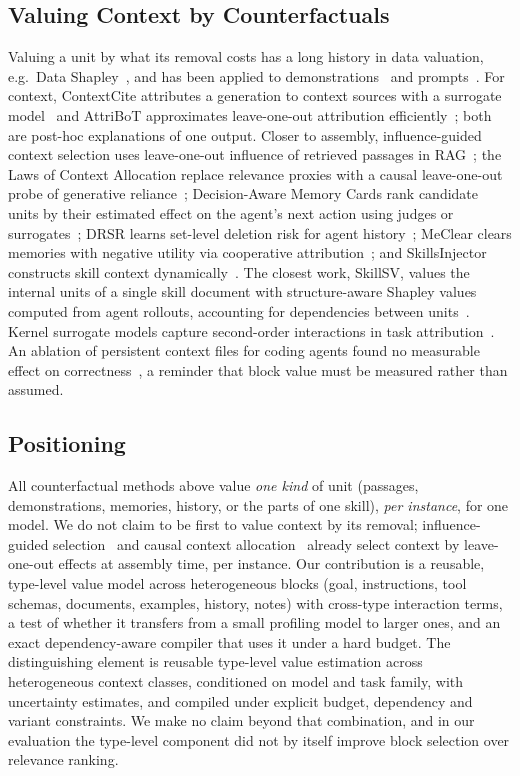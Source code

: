 \subsection{Valuing Context by Counterfactuals}
Valuing a unit by what its removal costs has a long history in data valuation, e.g.\ Data Shapley~\citep{datashapley2019},
and has been applied to demonstrations~\citep{demoshapley2024} and prompts~\citep{promptshapley2023}. For context,
ContextCite attributes a generation to context sources with a surrogate model~\citep{contextcite2024} and AttriBoT
approximates leave-one-out attribution efficiently~\citep{attribot2024}; both are post-hoc explanations of one output.
Closer to assembly, influence-guided context selection uses leave-one-out influence of retrieved passages in
RAG~\citep{civalue2025}; the Laws of Context Allocation replace relevance proxies with a causal leave-one-out probe of
generative reliance~\citep{ctxalloc2026}; Decision-Aware Memory Cards rank candidate units by their estimated effect on the
agent's next action using judges or surrogates~\citep{cicl2026}; DRSR learns set-level deletion risk for agent
history~\citep{drsr2026}; MeClear clears memories with negative utility via cooperative attribution~\citep{meclear2026}; and
SkillsInjector constructs skill context dynamically~\citep{skillsinjector2026}. The closest work, SkillSV, values the
internal units of a single skill document with structure-aware Shapley values computed from agent rollouts, accounting for
dependencies between units~\citep{skillsv2026}. Kernel surrogate models capture second-order interactions in task
attribution~\citep{kernelsurrogate2026}. An ablation of persistent context files for coding agents found no measurable
effect on correctness~\citep{ctxfiles2026}, a reminder that block value must be measured rather than assumed.

\subsection{Positioning}
All counterfactual methods above value \emph{one kind} of unit (passages, demonstrations, memories, history, or the parts
of one skill), \emph{per instance}, for one model. We do not claim to be first to value context by its removal; influence-guided selection~\citep{civalue2025} and
causal context allocation~\citep{ctxalloc2026} already select context by leave-one-out effects at assembly time, per
instance. Our
contribution is a reusable, type-level value model across heterogeneous blocks (goal, instructions, tool schemas,
documents, examples, history, notes) with cross-type interaction terms, a test of whether it transfers from a small
profiling model to larger ones, and an exact dependency-aware compiler that uses it under a hard budget. The distinguishing element is reusable type-level value estimation across heterogeneous context classes,
conditioned on model and task family, with uncertainty estimates, and compiled under explicit budget, dependency and
variant constraints. We make no claim beyond that combination, and in our evaluation the type-level component did not
by itself improve block selection over relevance ranking.
